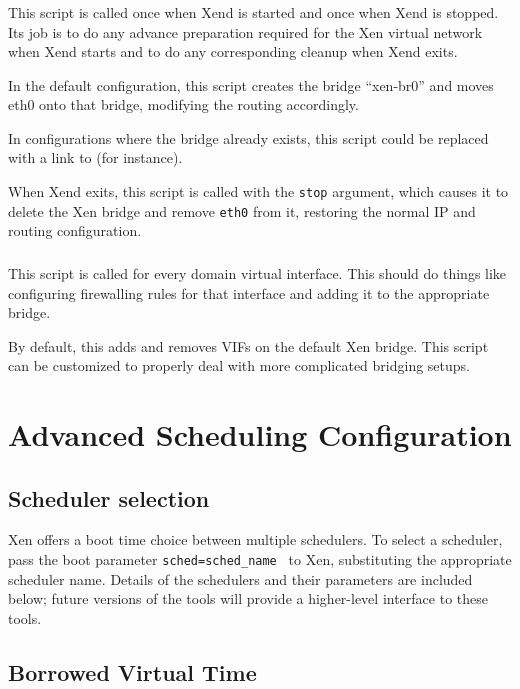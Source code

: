 \documentclass[11pt,twoside,final,openright]{xenstyle}
\begin{document}
{\subsection{}

This script is called once when Xend is started and once when Xend is
stopped.  Its job is to do any advance preparation required for the
Xen virtual network when Xend starts and to do any corresponding
cleanup when Xend exits.

In the default configuration, this script creates the bridge
``xen-br0'' and moves eth0 onto that bridge, modifying the routing
accordingly.

In configurations where the bridge already exists, this script could
be replaced with a link to  (for instance).

When Xend exits, this script is called with the {\tt stop} argument,
which causes it to delete the Xen bridge and remove {\tt eth0} from
it, restoring the normal IP and routing configuration.

\subsection{}

This script is called for every domain virtual interface.  This should
do things like configuring firewalling rules for that interface and
adding it to the appropriate bridge.

By default, this adds and removes VIFs on the default Xen bridge.
This script can be customized to properly deal with more complicated
bridging setups.

\chapter{Advanced Scheduling Configuration}

\section{Scheduler selection}

Xen offers a boot time choice between multiple schedulers.  To select
a scheduler, pass the boot parameter { \tt sched=sched\_name } to Xen,
substituting the appropriate scheduler name.  Details of the schedulers
and their parameters are included below; future versions of the tools
will provide a higher-level interface to these tools.

\section{Borrowed Virtual Time}

}
\end{document}
